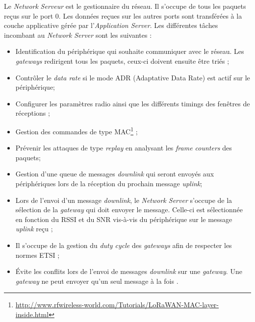 Le \textit{Network} \textit{Serveur} est le gestionnaire du réseau. Il s'occupe de tous les paquets reçus sur le port 0. Les données reçues sur les autres ports sont transférées à la couche applicative gérée par l'\textit{Application Server}. Les différentes tâches incombant au \textit{Network Server} sont les suivantes \cite{ttnvideos_network:online} : 
\begin{itemize}
    \item Identification du périphérique qui souhaite communiquer avec le réseau. Les \textit{gateways} redirigent tous les paquets, ceux-ci doivent ensuite être triés \cite{ttnvideos_network:online};
    \item Contrôler le \textit{data rate} si le mode ADR (Adaptative Data Rate) est actif sur le périphérique;
    
    \item Configurer les paramètres radio ainsi que les différents timings des fenêtres de réceptions \cite{ttnvideos_network:online};
    
    \item Gestion des commandes de type MAC\footnote{\url{http://www.rfwireless-world.com/Tutorials/LoRaWAN-MAC-layer-inside.html}} \cite{HomeTheT94:online};
    
    \item Prévenir les attaques de type \textit{replay} en analysant les \textit{frame counters} des paquets;
    
    \item Gestion d'une queue de messages \textit{downlink} qui seront envoyés aux périphériques lors de la réception du prochain message \textit{uplink};
    
    \item Lors de l'envoi d'un message \textit{downlink}, le \textit{Network Server} s'occupe de la sélection de la \textit{gateway} qui doit envoyer le message. Celle-ci est sélectionnée en fonction du RSSI et du SNR vis-à-vis du périphérique sur le message \textit{uplink} reçu \cite{ttnvideos_network:online};
    
    \item Il s'occupe de la gestion du \textit{duty cycle} des \textit{gateways} afin de respecter les normes ETSI \cite{ttnvideos_network:online};
    
    \item Évite les conflits lors de l'envoi de messages \textit{downlink} sur une \textit{gateway}. Une \textit{gateway} ne peut envoyer qu'un seul message à la fois \cite{ttnvideos_network:online}.
\end{itemize}


